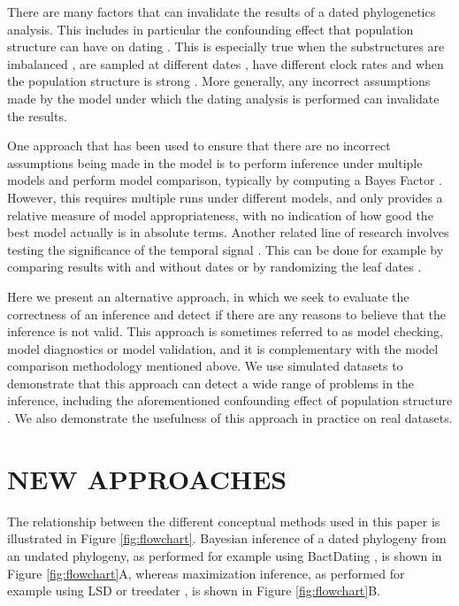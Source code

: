 \documentclass{article}
\begin{document}
There are many factors that can invalidate the results of a dated phylogenetics analysis.
This includes in particular the confounding effect that population structure can have on dating 
\citep{Duchene2015a,Murray2016}. This is especially true when the substructures are 
imbalanced \citep{ducheneTreeImbalanceCauses2015}, are sampled
at different dates \citep{tongComparisonMethodsEstimating2018}, have different clock rates
\citep{wertheimInconsistenciesEstimatingAge2012}  and when the population structure is strong 
\citep{navascuesElevatedSubstitutionRate2009}. 
More generally, any incorrect assumptions made by the model under which the dating analysis is performed
can invalidate the results.

One approach that has been used to ensure that there are no incorrect assumptions being made in the 
model is to perform inference under multiple models and perform model comparison,
typically by computing a Bayes Factor \citep{Baele2012,Li2012,bouckaertBModelTestBayesianPhylogenetic2017}. 
However, this requires multiple runs under different models, and only provides a relative measure
of model appropriateness, with no indication of how good the best model actually is in absolute terms.
Another related line of research involves testing the significance of the temporal signal 
\citep{Duchene2015a,Duchene2020}. This can be done for example by 
comparing results with and without dates \citep{Rambaut2000} or by 
randomizing the leaf dates \citep{Duchene2015a}. 

Here we present an alternative approach, in which we seek to evaluate
the correctness of an inference and detect if there are any reasons to believe that the inference is not valid.
This approach is sometimes referred to as model checking, model diagnostics or model validation, 
and it is complementary with the model comparison methodology mentioned above. 
We use simulated datasets to demonstrate that this approach can detect a wide range of problems
in the inference, including the aforementioned confounding effect of population structure
\citep{Murray2016}. 
We also demonstrate the usefulness of this approach in practice on real datasets.

\section*{NEW APPROACHES}

The relationship between the different conceptual methods
 used in this paper is illustrated in Figure \ref{fig:flowchart}.  
 Bayesian inference of a dated phylogeny from an undated phylogeny,
 as performed for example using BactDating \citep{Didelot2018}, is shown in Figure \ref{fig:flowchart}A,
 whereas maximization inference, as performed for example using
 LSD \citep{To2016} or treedater \citep{Volz2017}, is shown in Figure \ref{fig:flowchart}B.
 
\end{document}
